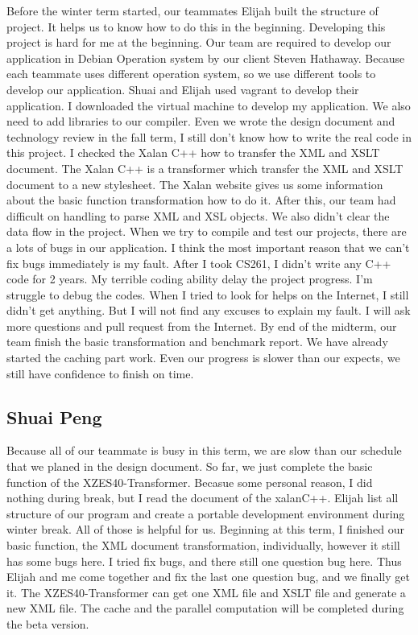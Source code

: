 Before the winter term started, our teammates Elijah built the structure of project. 
It helps us to know how to do this in the beginning. 
Developing this project is hard for me at the beginning.
Our team are required to develop our application in Debian Operation system by our client Steven Hathaway.
Because each teammate uses different operation system, so we use different tools to develop our application.
Shuai and Elijah used vagrant to develop their application.
I downloaded the virtual machine to develop my application.
We also need to add libraries to our compiler.  
Even we wrote the design document and technology review in the fall term, I still don't know how to write the real code in this project. 
I checked the Xalan C++ how to transfer the XML and XSLT document.
The Xalan C++ is a transformer which transfer the XML and XSLT document to a new stylesheet.
The Xalan website gives us some information about the basic function transformation how to do it. 
After this, our team had difficult on handling to parse XML and XSL objects.
We also didn't clear the data flow in the project. 
When we try to compile and test our projects, there are a lots of bugs in our application. 
I think the most important reason that we can’t fix bugs immediately is my fault. 
After I took CS261, I didn’t write any C++ code for 2 years. 
My terrible coding ability delay the project progress. I’m struggle to debug the codes. 
When I tried to look for helps on the Internet, I still didn’t get anything.
But I will not find any excuses to explain my fault. 
I will ask more questions and pull request from the Internet. 
By end of the midterm, our team finish the basic transformation and benchmark report.
We have already started the caching part work. 
Even our progress is slower than our expects, we still have confidence to finish on time. 

\subsection{Shuai Peng}

Because all of our teammate is busy in this term, we are slow than our schedule that we planed in the design document. 
So far, we just complete the basic function of the XZES40-Transformer.
Becasue some personal reason, I did nothing during break, but I read the document of the xalanC++.
Elijah list all structure of our program and create a portable development environment during winter break. 
All of those is helpful for us.
Beginning at this term, I finished our basic function, the XML document transformation, individually, however it still has some bugs here.
I tried fix bugs, and there still one question bug here.
Thus Elijah and me come together and fix the last one question bug, and we finally get it.
The XZES40-Transformer can get one XML file and XSLT file and generate a new XML file.
The cache and the parallel computation will be completed during the beta version.

